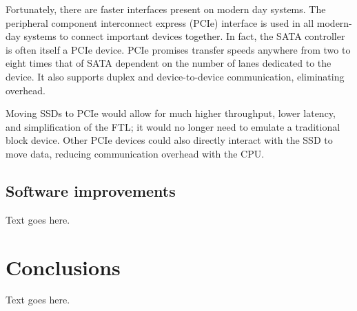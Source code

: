 \documentclass[format=acmsmall, review=false, screen=true]{acmart}
\begin{document}
Fortunately, there are faster interfaces present on modern day systems. The peripheral component interconnect express 
(PCIe) interface is used in all modern-day systems to connect important devices together. In fact, the SATA controller 
is often itself a PCIe device. PCIe promises transfer speeds anywhere from two to eight times that of SATA dependent on 
the number of lanes dedicated to the device. It also supports duplex and device-to-device communication, eliminating 
overhead. \cite{Micheloni2013}

Moving SSDs to PCIe would allow for much higher throughput, lower latency, and simplification of the FTL; it would no 
longer need to emulate a traditional block device. Other PCIe devices could also directly interact with the SSD to move 
data, reducing communication overhead with the CPU. \cite{Micheloni2013}

\subsection{Software improvements}

Text goes here.

\section{Conclusions}

Text goes here.



\end{document}
